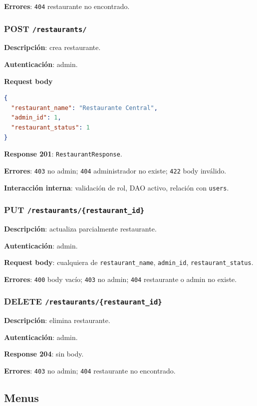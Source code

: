 \documentclass[12pt,letterpaper]{article}
\def\codefile#1{\nolinkurl{#1}}
\def\methodpost{\textbf{\color{green!45!black}POST}}
\def\methodput{\textbf{\color{orange!80!black}PUT}}
\def\methoddelete{\textbf{\color{red!70!black}DELETE}}
\begin{document}
\textbf{Errores}: \codefile{404} restaurante no encontrado.

\subsubsection{\methodpost{} \codefile{/restaurants/}}

\textbf{Descripción}: crea restaurante.

\textbf{Autenticación}: admin.

\textbf{Request body}
\begin{lstlisting}[language=json]
{
  "restaurant_name": "Restaurante Central",
  "admin_id": 1,
  "restaurant_status": 1
}
\end{lstlisting}

\textbf{Response 201}: \codefile{RestaurantResponse}.

\textbf{Errores}: \codefile{403} no admin; \codefile{404} administrador no existe; \codefile{422} body inválido.

\textbf{Interacción interna}: validación de rol, DAO activo, relación con \codefile{users}.

\subsubsection{\methodput{} \codefile{/restaurants/{restaurant_id}}}

\textbf{Descripción}: actualiza parcialmente restaurante.

\textbf{Autenticación}: admin.

\textbf{Request body}: cualquiera de \codefile{restaurant\_name}, \codefile{admin\_id}, \codefile{restaurant\_status}.

\textbf{Errores}: \codefile{400} body vacío; \codefile{403} no admin; \codefile{404} restaurante o admin no existe.

\subsubsection{\methoddelete{} \codefile{/restaurants/{restaurant_id}}}

\textbf{Descripción}: elimina restaurante.

\textbf{Autenticación}: admin.

\textbf{Response 204}: sin body.

\textbf{Errores}: \codefile{403} no admin; \codefile{404} restaurante no encontrado.

\subsection{Menus}
\end{document}
